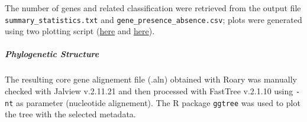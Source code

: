 The number of genes and related classification were retrieved from the output file
\texttt{summary\_statistics.txt} and \texttt{gene\_presence\_absence.csv}; plots were generated using two
plotting script (\href{https://github.com/sanger-pathogens/Roary/blob/master/bin/create_pan_genome_plots.R}{here}
and \href{https://github.com/sanger-pathogens/Roary/blob/master/contrib/roary_plots/roary_plots.py}{here}).


\subparagraph*{Phylogenetic Structure}

The resulting core gene alignement file (.aln) obtained with Roary was manually checked with
Jalview v.2.11.21 and then processed with FastTree v.2.1.10
using \texttt{-nt} as parameter (nucleotide alignement). The R package \texttt{ggtree} was used to plot
the tree with the selected metadata.





